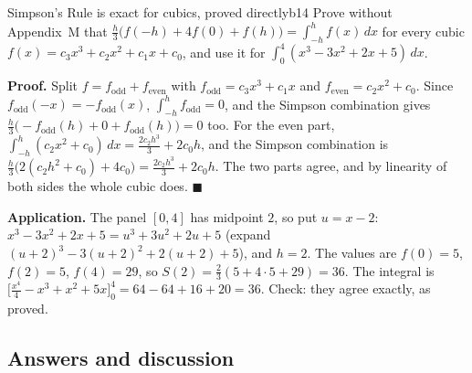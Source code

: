 \documentclass[11pt]{article}
\begin{document}
\begin{exmp}{Simpson's Rule is exact for cubics, proved directly}{b14}
Prove without Appendix~M that $\frac h3\bigl(f(-h)+4f(0)+f(h)\bigr)=\int_{-h}^hf(x)\,dx$ for every cubic $f(x)=c_3x^3+c_2x^2+c_1x+c_0$, and use it for $\int_0^4(x^3-3x^2+2x+5)\,dx$.

\textbf{Proof.} Split $f=f_{\text{odd}}+f_{\text{even}}$ with $f_{\text{odd}}=c_3x^3+c_1x$ and $f_{\text{even}}=c_2x^2+c_0$. Since $f_{\text{odd}}(-x)=-f_{\text{odd}}(x)$, $\int_{-h}^hf_{\text{odd}}=0$, and the Simpson combination gives $\frac h3\bigl(-f_{\text{odd}}(h)+0+f_{\text{odd}}(h)\bigr)=0$ too. For the even part, $\int_{-h}^h(c_2x^2+c_0)\,dx=\frac{2c_2h^3}3+2c_0h$, and the Simpson combination is $\frac h3\bigl(2(c_2h^2+c_0)+4c_0\bigr)=\frac{2c_2h^3}3+2c_0h$. The two parts agree, and by linearity of both sides the whole cubic does. $\blacksquare$

\textbf{Application.} The panel $[0,4]$ has midpoint $2$, so put $u=x-2$: $x^3-3x^2+2x+5=u^3+3u^2+2u+5$ (expand $(u+2)^3-3(u+2)^2+2(u+2)+5$), and $h=2$. The values are $f(0)=5$, $f(2)=5$, $f(4)=29$, so $S(2)=\frac23(5+4\cdot5+29)=36$. The integral is $\bigl[\tfrac{x^4}4-x^3+x^2+5x\bigr]_0^4=64-64+16+20=36$. Check: they agree exactly, as proved.
\end{exmp}

\subsection*{Answers and discussion}
\end{document}
